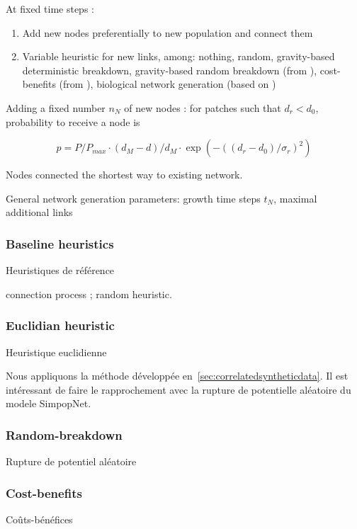 At fixed time steps :

\begin{enumerate}
	\item Add new nodes preferentially to new population and connect them
	\item \justify Variable heuristic for new links, among: nothing, random, gravity-based deterministic breakdown, gravity-based random breakdown (from \cite{schmitt2014modelisation}), cost-benefits (from \cite{louf2013emergence}), biological network generation (based on \cite{tero2010rules})
\end{enumerate}

Adding a fixed number $n_N$ of new nodes : for patches such that $d_r < d_0$, probability to receive a node is

\[
p = P/P_{max} \cdot (d_M - d)/d_M \cdot \exp\left(-((d_r - d_0)/\sigma_r)^2\right)
\]

Nodes connected the shortest way to existing network.

General network generation parameters: growth time steps $t_N$, maximal additional links


\subsubsection{Baseline heuristics}{Heuristiques de référence}

connection process ; random heuristic.


\subsubsection{Euclidian heuristic}{Heuristique euclidienne}

Nous appliquons la méthode développée en~\ref{sec:correlatedsyntheticdata}. Il est intéressant de faire le rapprochement avec la rupture de potentielle aléatoire du modele SimpopNet.





\subsubsection{Random-breakdown}{Rupture de potentiel aléatoire}




\subsubsection{Cost-benefits}{Coûts-bénéfices}





